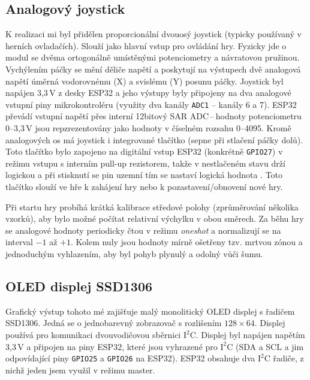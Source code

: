 \documentclass[11pt,a4paper]{article}
\begin{document}
\subsection{Analogový joystick}

K realizaci mi byl přidělen proporcionální dvouosý joystick (typicky používaný v herních ovladačích). Slouží jako hlavní vstup pro ovládání hry. Fyzicky jde o modul se dvěma ortogonálně
umístěnými potenciometry a návratovou pružinou. Vychýlením páčky se mění děliče napětí a poskytují na výstupech dvě analogová napětí úměrná vodorovnému (X) a svislému (Y) posunu páčky. 
Joystick byl napájen 3,3\,V z desky ESP32 a jeho výstupy byly připojeny na dva analogové vstupní piny mikrokontroléru (využity dva kanály \texttt{ADC1} -- kanály 6 a 7). ESP32 převádí vstupní
napětí přes interní 12bitový SAR ADC\,--\,hodnoty potenciometru 0--3,3\,V jsou repzrezentovány jako hodnoty v číselném rozsahu 0--4095. Kromě analogových os má joystick i integrované
tlačítko (sepne při stlačení páčky dolů). Toto tlačítko bylo zapojeno na digitální vstup ESP32 (konkrétně \texttt{GPIO27}) v režimu vstupu s interním pull-up rezistorem, takže v nestlačeném
stavu drží logickou  a při stisknutí se pin uzemní tím se nastaví logická hodnota . Toto tlačítko slouží ve hře k zahájení hry nebo k pozastavení/obnovení nové hry.

Při startu hry probíhá krátká kalibrace středové polohy (zprůměrování několika vzorků), aby bylo možné počítat relativní výchylku v obou směrech. Za běhu hry se analogové hodnoty periodicky čtou v režimu \emph{oneshot} a normalizují se na interval $-1$ až $+1$. Kolem nuly jsou hodnoty mírně 
ošetřeny tzv. mrtvou zónou a jednoduchým vyhlazením, aby byl pohyb plynulý a odolný vůči šumu.

\subsection{OLED displej SSD1306}

Grafický výstup tohoto mé  zajišťuje malý monolitický OLED displej s řadičem SSD1306\cite{ssd1306}. Jedná se o jednobarevný zobrazovač s rozlišením $128\times64$. Displej používá
pro komunikaci dvouvodičovou sběrnici $\text{I}^2\text{C}$. Displej byl napájen napětím 3,3\,V a připojen na piny ESP32, které jsou vyhrazené pro $\text{I}^2\text{C}$ (SDA a SCL a jim 
odpovídající piny \texttt{GPIO25} a \texttt{GPIO26} na ESP32). ESP32 obsahuje dva $\text{I}^2\text{C}$ řadiče, z nichž jeden jsem využil v režimu master. 
\end{document}
